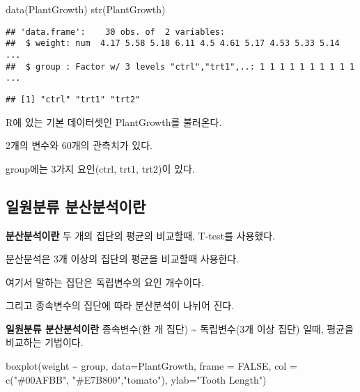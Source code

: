 \documentclass[
]{article}
\newenvironment{Shaded}{\begin{snugshade}}{\end{snugshade}}
\newcommand{\AttributeTok}[1]{\textcolor[rgb]{0.77,0.63,0.00}{#1}}
\newcommand{\ConstantTok}[1]{\textcolor[rgb]{0.00,0.00,0.00}{#1}}
\newcommand{\FunctionTok}[1]{\textcolor[rgb]{0.00,0.00,0.00}{#1}}
\newcommand{\NormalTok}[1]{#1}
\newcommand{\SpecialCharTok}[1]{\textcolor[rgb]{0.00,0.00,0.00}{#1}}
\newcommand{\StringTok}[1]{\textcolor[rgb]{0.31,0.60,0.02}{#1}}
\begin{document}
\begin{Shaded}
\begin{Highlighting}[]
\FunctionTok{data}\NormalTok{(PlantGrowth)}
\FunctionTok{str}\NormalTok{(PlantGrowth)}
\end{Highlighting}
\end{Shaded}

\begin{verbatim}
## 'data.frame':    30 obs. of  2 variables:
##  $ weight: num  4.17 5.58 5.18 6.11 4.5 4.61 5.17 4.53 5.33 5.14 ...
##  $ group : Factor w/ 3 levels "ctrl","trt1",..: 1 1 1 1 1 1 1 1 1 1 ...
\end{verbatim}

\begin{Shaded}
\end{Shaded}

\begin{verbatim}
## [1] "ctrl" "trt1" "trt2"
\end{verbatim}

R에 있는 기본 데이터셋인 PlantGrowth를 불러온다.

2개의 변수와 60개의 관측치가 있다.

group에는 3가지 요인(ctrl, trt1, trt2)이 있다.

\hypertarget{uxc77cuxc6d0uxbd84uxb958-uxbd84uxc0b0uxbd84uxc11duxc774uxb780}{%
\subsection{일원분류 분산분석이란}\label{uxc77cuxc6d0uxbd84uxb958-uxbd84uxc0b0uxbd84uxc11duxc774uxb780}}

\textbf{분산분석이란}
두 개의 집단의 평균의 비교할때, T-test를 사용했다.

분산분석은 3개 이상의 집단의 평균을 비교할때 사용한다.

여기서 말하는 집단은 독립변수의 요인 개수이다.

그리고 종속변수의 집단에 따라 분산분석이 나뉘어 진다.

\textbf{일원분류 분산분석이란}
종속변수(한 개 집단) \textasciitilde{} 독립변수(3개 이상 집단) 일때, 평균을 비교하는 기법이다.

\begin{Shaded}
\begin{Highlighting}[]
\FunctionTok{boxplot}\NormalTok{(weight }\SpecialCharTok{\textasciitilde{}}\NormalTok{ group, }
        \AttributeTok{data=}\NormalTok{PlantGrowth,}
        \AttributeTok{frame =} \ConstantTok{FALSE}\NormalTok{, }
        \AttributeTok{col =} \FunctionTok{c}\NormalTok{(}\StringTok{"\#00AFBB"}\NormalTok{, }\StringTok{"\#E7B800"}\NormalTok{,}\StringTok{"tomato"}\NormalTok{),}
        \AttributeTok{ylab=}\StringTok{"Tooth Length"}\NormalTok{)}
\end{Highlighting}
\end{Shaded}
\end{document}
